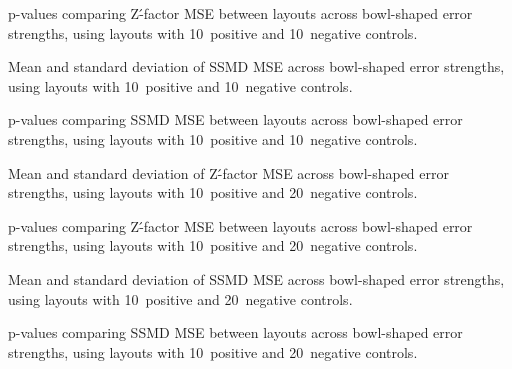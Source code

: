 \begin{table}[p]
    \centering
    \small
    
    \caption{p-values comparing Z\'-factor MSE between layouts across bowl-shaped error strengths, using layouts with 10~positive and 10~negative controls.}
    \label{tab:metrics-zfactor-pvalues-10-10}
\end{table}

\begin{table}[p]
    \centering
    \small
    
    \caption{Mean and standard deviation of SSMD MSE across bowl-shaped error strengths, using layouts with 10~positive and 10~negative controls.}
    \label{tab:metrics-ssmd-mean-std-10-10}
\end{table}

\begin{table}[p]
    \centering
    \small
    
    \caption{p-values comparing SSMD MSE between layouts across bowl-shaped error strengths, using layouts with 10~positive and 10~negative controls.}
    \label{tab:metrics-ssmd-pvalues-10-10}
\end{table}

\begin{table}[p]
    \centering
    \small
    
    \caption{Mean and standard deviation of Z\'-factor MSE across bowl-shaped error strengths, using layouts with 10~positive and 20~negative controls.}
    \label{tab:metrics-zfactor-mean-std-20-10}
\end{table}

\begin{table}[p]
    \centering
    \small
    
    \caption{p-values comparing Z\'-factor MSE between layouts across bowl-shaped error strengths, using layouts with 10~positive and 20~negative controls.}
    \label{tab:metrics-zfactor-pvalues-20-10}
\end{table}

\begin{table}[p]
    \centering
    \small
    
    \caption{Mean and standard deviation of SSMD MSE across bowl-shaped error strengths, using layouts with 10~positive and 20~negative controls.}
    \label{tab:metrics-ssmd-mean-std-20-10}
\end{table}

\begin{table}[p]
    \centering
    \small
    
    \caption{p-values comparing SSMD MSE between layouts across bowl-shaped error strengths, using layouts with 10~positive and 20~negative controls.}
    \label{tab:metrics-ssmd-pvalues-20-10}
\end{table}


